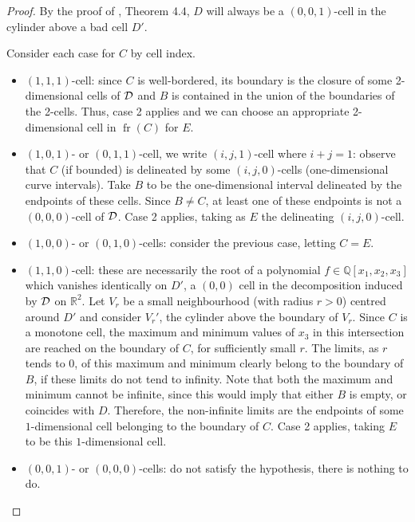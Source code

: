 \documentclass[
]{book}
\theoremstyle{definition}
\theoremstyle{definition}
\theoremstyle{definition}
\theoremstyle{definition}
\theoremstyle{remark}
\begin{document}
\begin{proof}

By the proof of \citet{lazard10}, Theorem 4.4, \(D\) will always be a \((0,0,1)\)-cell in the cylinder above a bad cell \(D'\).

Consider each case for \(C\) by cell index.

\begin{itemize}
\item
  \((1,1,1)\)-cell: since \(C\) is well-bordered, its boundary is the closure of some 2-dimensional cells of \(\cal D\) and \(B\) is contained in the union of the boundaries of the 2-cells. Thus, case 2 applies and we can choose an appropriate 2-dimensional cell in \({\operatorname{fr} \left( C \right)}\) for \(E\).
\item
  \((1,0,1)\)- or \((0,1,1)\)-cell, we write \((i,j,1)\)-cell where \(i+j=1\): observe that \(C\) (if bounded) is delineated by some \((i,j,0)\)-cells (one-dimensional curve intervals). Take \(B\) to be the one-dimensional interval delineated by the endpoints of these cells. Since \(B \neq C\), at least one of these endpoints is not a \((0,0,0)\)-cell of \(\cal D\). Case 2 applies, taking as \(E\) the delineating \((i,j,0)\)-cell.
\item
  \((1,0,0)\)- or \((0,1,0)\)-cells: consider the previous case, letting \(C = E\).
\item
  \((1,1,0)\)-cell: these are necessarily the root of a polynomial \(f \in \mathbb{Q}[x_1,x_2,x_3]\) which vanishes identically on \(D'\), a \((0,0)\) cell in the decomposition induced by \(\cal D\) on \(\mathbb{R}^2\).
  Let \(V_r\) be a small neighbourhood (with radius \(r > 0\)) centred around \(D'\) and consider \(V_r'\), the cylinder above the boundary of \(V_r\). Since \(C\) is a monotone cell, the maximum and minimum values of \(x_3\) in this intersection are reached on the boundary of \(C\), for sufficiently small \(r\). The limits, as \(r\) tends to \(0\), of this maximum and minimum clearly belong to the boundary of \(B\), if these limits do not tend to infinity. Note that both the maximum and minimum cannot be infinite, since this would imply that either \(B\) is empty, or coincides with \(D\). Therefore, the non-infinite limits are the endpoints of some \(1\)-dimensional cell belonging to the boundary of \(C\). Case 2 applies, taking \(E\) to be this \(1\)-dimensional cell.
\item
  \((0,0,1)\)- or \((0,0,0)\)-cells: do not satisfy the hypothesis, there is nothing to do.
\end{itemize}

\end{proof}
\end{document}
